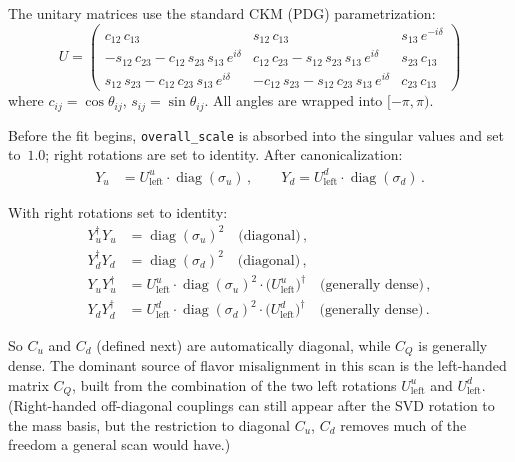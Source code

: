 \documentclass[11pt]{article}
\begin{document}
The unitary matrices use the standard CKM (PDG) parametrization:
\begin{equation}
  U = \begin{pmatrix}
    c_{12}\,c_{13}
      & s_{12}\,c_{13}
      & s_{13}\,e^{-i\delta} \\
    -s_{12}\,c_{23} - c_{12}\,s_{23}\,s_{13}\,e^{i\delta}
      & c_{12}\,c_{23} - s_{12}\,s_{23}\,s_{13}\,e^{i\delta}
      & s_{23}\,c_{13} \\
    s_{12}\,s_{23} - c_{12}\,c_{23}\,s_{13}\,e^{i\delta}
      & -c_{12}\,s_{23} - s_{12}\,c_{23}\,s_{13}\,e^{i\delta}
      & c_{23}\,c_{13}
  \end{pmatrix}
\end{equation}
where $c_{ij} = \cos\theta_{ij}$, $s_{ij} = \sin\theta_{ij}$.  All angles are
wrapped into $[-\pi,\pi)$.

Before the fit begins, \texttt{overall\_scale} is
absorbed into the singular values and set to~$1.0$; right rotations are set to
identity.  After canonicalization:
\begin{align}
  Y_u &= U_{\mathrm{left}}^u \cdot
    \operatorname{diag}(\sigma_u)\,, \qquad
  Y_d = U_{\mathrm{left}}^d \cdot
    \operatorname{diag}(\sigma_d)\,.
\end{align}

With right rotations set
to identity:
\begin{align}
  Y_u^\dagger Y_u &= \operatorname{diag}(\sigma_u)^2 \quad\text{(diagonal)}\,, \\
  Y_d^\dagger Y_d &= \operatorname{diag}(\sigma_d)^2 \quad\text{(diagonal)}\,, \\
  Y_u Y_u^\dagger &= U_{\mathrm{left}}^u \cdot \operatorname{diag}(\sigma_u)^2
    \cdot \bigl(U_{\mathrm{left}}^u\bigr)^\dagger
    \quad\text{(generally dense)}\,, \\
  Y_d Y_d^\dagger &= U_{\mathrm{left}}^d \cdot \operatorname{diag}(\sigma_d)^2
    \cdot \bigl(U_{\mathrm{left}}^d\bigr)^\dagger
    \quad\text{(generally dense)}\,.
\end{align}

So $C_u$ and $C_d$ (defined next) are automatically diagonal, while $C_Q$ is
generally dense.  The dominant source of flavor misalignment in this scan is
the left-handed matrix $C_Q$, built from the combination of the two left
rotations $U_{\mathrm{left}}^u$ and $U_{\mathrm{left}}^d$. (Right-handed
off-diagonal couplings can still appear after the SVD rotation to the mass
basis, but the restriction to diagonal $C_u$, $C_d$ removes much of the
freedom a general scan would have.)
\end{document}
